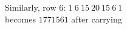 \documentclass[preview]{standalone}
\begin{document}
\begin{center}
Similarly, row 6: $1\ 6\ 15\ 20\ 15\ 6\ 1$\\becomes $1771561$ after carrying
\end{center}
\end{document}
